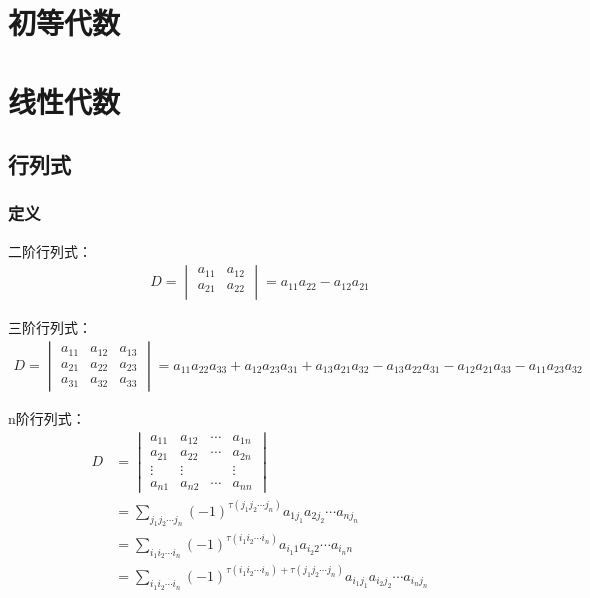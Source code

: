 \documentclass[12pt]{book}
\begin{document}
\chapter{初等代数}





\chapter{线性代数}







\section{行列式}


\subsection{定义}

二阶行列式：
\begin{gather*}
    D = \begin{vmatrix}
        a_{11} & a_{12} \\
        a_{21} & a_{22} \\
    \end{vmatrix}
    =  a_{11} a_{22} - a_{12} a_{21}
\end{gather*}

三阶行列式：
\begin{gather*}
    D = \begin{vmatrix}
        a_{11} & a_{12} & a_{13} \\
        a_{21} & a_{22} & a_{23} \\
        a_{31} & a_{32} & a_{33} 
    \end{vmatrix}
    = a_{11} a_{22} a_{33} 
    + a_{12} a_{23} a_{31} 
    + a_{13} a_{21} a_{32}
    - a_{13} a_{22} a_{31} 
    - a_{12} a_{21} a_{33} 
    - a_{11} a_{23} a_{32}
\end{gather*}

n阶行列式：
\begin{align*}
    D &= \begin{vmatrix}
        a_{11} & a_{12} & \cdots & a_{1n} \\
        a_{21} & a_{22} & \cdots & a_{2n} \\
        \vdots & \vdots &        & \vdots \\
        a_{n1} & a_{n2} & \cdots & a_{nn} 
    \end{vmatrix}\\
    &= \sum_{j_1 j_2\cdots j_n}{
        (-1)^{\tau(j_1 j_2\cdots j_n)}
        a_{1j_{1}} a_{2j_2} \cdots a_{nj_{n}}
    }\\
    &= \sum_{i_1 i_2\cdots i_n}{
        (-1)^{\tau(i_1 i_2\cdots i_n)}
        a_{i_{1}1} a_{i_{2}2} \cdots a_{i_{n}n}
    }\\
    &= \sum_{i_1 i_2\cdots i_n}{
        (-1)^{\tau(i_1 i_2\cdots i_n)+\tau(j_1 j_2\cdots j_n)}
        a_{i_{1}j_{1}} a_{i_{2}j_{2}} \cdots a_{i_{n}j_{n}}
    }
\end{align*}
\end{document}
